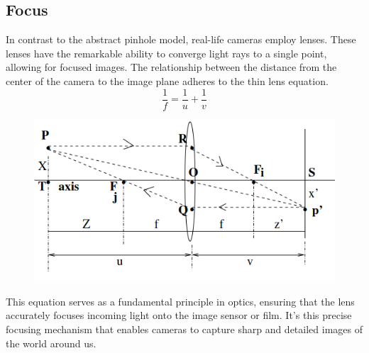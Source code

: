 \subsection{Focus}
In contrast to the abstract pinhole model, real-life cameras employ lenses. These lenses have the remarkable ability to converge light rays to a single point, allowing for focused images. 
The relationship between the distance from the center of the camera to the image plane adheres to the thin lens equation.
\[
    \frac{1}{f} = \frac{1}{u} + \frac{1}{v}
\]
\begin{figure}
    \includegraphics[scale=0.4]{Figures/ThinLenses.png}
\end{figure}

This equation serves as a fundamental principle in optics, ensuring that the lens accurately focuses incoming light onto the image sensor or film. 
It's this precise focusing mechanism that enables cameras to capture sharp and detailed images of the world around us.\\


